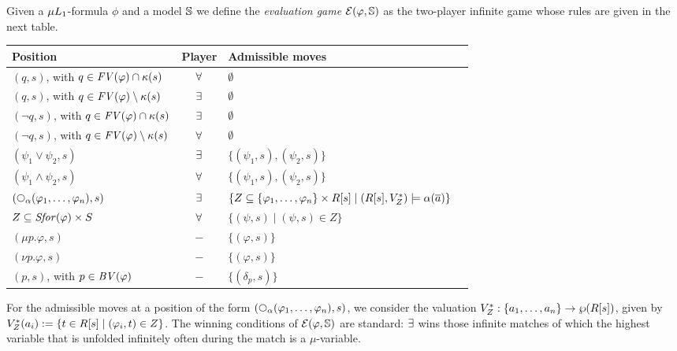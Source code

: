 \begin{definition}
Given a $\mu L_{1}$-formula $\phi$ and a model $\mathbb{S}$ we define the 
\emph{evaluation game} $\mathcal{E}(\varphi,\mathbb{S})$ as the two-player infinite
game %
whose rules are given in the next table.
\begin{center}
\begin{tabular}{|l|c|l|c|}
\hline
Position & Player & Admissible moves
\\\hline
    $(q,s)$, with $q \in \mathit{FV}(\varphi) \cap \kappa(s)$ 
  & $\forall$ 
  & $\emptyset$
\\  $(q,s)$, with $q \in \mathit{FV}(\varphi) \setminus \kappa(s)$ 
  & $\exists$ & $\emptyset$
\\  $(\lnot q,s)$, with $q \in \mathit{FV}(\varphi) \cap \kappa(s)$ 
  & $\exists$ 
  & $\emptyset$
\\  $(\lnot q,s)$, with $q \in \mathit{FV}(\varphi) \setminus \kappa(s)$ 
  & $\forall$ 
  & $\emptyset$
\\ $(\psi_1 \lor \psi_2,s)$ 
  & $\exists$ 
  & $\{(\psi_1,s),(\psi_2,s) \}$ 
\\  $(\psi_1 \land \psi_2,s)$ 
  & $\forall$ 
  & $\{(\psi_1,s),(\psi_2,s) \}$ 
\\  $(\nxt{\al}(\varphi_{1},\ldots,\varphi_{n}),s)$ 
  & $\exists$ 
  & $\{ Z \subseteq \{ \varphi_{1},\ldots,\varphi_{n} \} \times R[s]
     \mid (R[s],V^{*}_{Z}) \models \alpha(\overline{a}) \}$ 
\\  $Z \subseteq  \mathit{Sfor}(\varphi) \times S$
  & $\forall$
  & $\{ (\psi, s) \mid (\psi,s) \in Z \}$
\\  $(\mu p.\varphi,s)$ & $-$ & $\{(\varphi,s) \}$ 
\\  $(\nu p.\varphi,s)$ & $-$ & $\{(\varphi,s) \}$ 
\\  $(p,s)$, with $p \in \mathit{BV}(\varphi)$ & $-$ & $\{(\delta_p,s) \}$ \\
  \hline
\end{tabular}
\end{center}
For the admissible moves at a position of the form 
$(\nxt{\al}(\varphi_{1},\ldots,\varphi_{n}),s)$, we consider the valuation 
$V^{*}_{Z}: \{ a_{1}, \ldots, a_{n} \} \to \wp(R[s])$, given by
$V^{*}_{Z}(a_{i}) \mathrel{:=} \{ t \in R[s] \mid (\varphi_{i},t) \in Z \}$.
The winning conditions of $\mathcal{E}(\varphi,\mathbb{S})$ are standard: $\exists$ wins
those infinite matches of which the highest variable that is unfolded infinitely
often during the match is a $\mu$-variable.
\end{definition}

